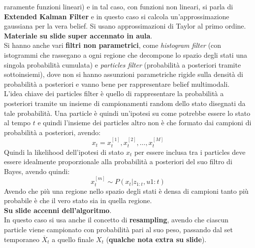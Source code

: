 \documentclass[a4paper,12pt, oneside]{book}
\begin{document}
raramente funzioni lineari) e in tal caso, con funzioni non 
lineari, si parla di \textbf{Extended Kalman Filter} e in questo caso si calcola
un'approssimazione gaussiana per la vera belief. Si usano approssimazioni di
Taylor al primo ordine. \textbf{Materiale su slide super accennato in aula}.\\
Si hanno anche vari \textbf{filtri non parametrici}, come \textit{histogram
  filter} (con istogrammi che rassegano a ogni regione che decompone lo spazio
degli stati una singola probabilità cumulata) e \textit{particles filter}
(probabilità a posteriori tramite 
sottoinsiemi), dove non si hanno assunzioni parametriche 
rigide sulla densità di probabilità a posteriori e vanno bene per rappresentare
belief multimodali.\\
L'idea chiave dei particles filter è quello di rappresentare la probabilità a
posteriori tramite un insieme di campionamenti random dello stato disegnati da
tale probabilità. Una particle è quindi un'ipotesi su come potrebbe essere lo
stato al tempo $t$ e quindi l'insieme dei particles altro non è che formato dai
campioni di probabilità a posteriori, avendo:
\[x_t=x_t^{[1]}, x_t^{[2]},\ldots,x_t^{[M]}\]
Quindi la likelihood dell'ipotesi di stato $x_t$ per essere inclusa tra i
particles deve essere idealmente proporzionale alla probabilità a posteriori del
suo filtro di Bayes, avendo quindi:
\[x_t^{[m]}\sim P(x_t|z_{1:t},u{1:t})\]
Avendo che più una regione nello spazio degli stati è densa di campioni tanto
più probabile è che il vero stato sia in quella regione. \\
\textbf{Su slide accenni dell'algoritmo}.\\
In questo caso si usa anche il concetto di \textbf{resampling}, avendo che
ciascun particle viene campionato con probabilità pari al suo peso, passando dal
set temporaneo $\overline{X}_t$ a quello finale $X_t$ (\textbf{qualche nota
  extra su slide}).
\end{document}
